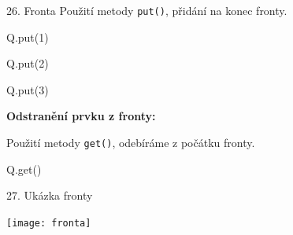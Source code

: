 \documentclass[czech]{beamer}
\newenvironment{lyxcode}
  {\par\begin{list}{}{
    \setlength{\rightmargin}{\leftmargin}
    \setlength{\listparindent}{0pt}%
    \raggedright
    \setlength{\itemsep}{0pt}
    \setlength{\parsep}{0pt}
    \normalfont\ttfamily}%
   \def\{{\char`\{}
   \def\}{\char`\}}
   \def\textasciitilde{\char`\~}
   \item[]}
  {\end{list}}
\begin{document}
\begin{frame}{26. Fronta}
{\tiny Použití metody }{\tiny\texttt{put()}}{\tiny , přidání na konec
fronty.}{\tiny\par}
\begin{lyxcode}
{\tiny Q.put(1)}{\tiny\par}

{\tiny Q.put(2)}{\tiny\par}

{\tiny Q.put(3)}{\tiny\par}
\end{lyxcode}
{\tiny\textbf{Odstranění prvku z fronty:}}{\tiny\par}

{\tiny Použití metody }{\tiny\texttt{get()}}{\tiny , odebíráme z počátku
fronty.}{\tiny\par}
\begin{lyxcode}
{\tiny Q.get()}{\tiny\par}
\end{lyxcode}
\end{frame}

\begin{frame}{27. Ukázka fronty}

\begin{center}
\texttt{[image: fronta]}
\par\end{center}

\end{frame}
\end{document}

